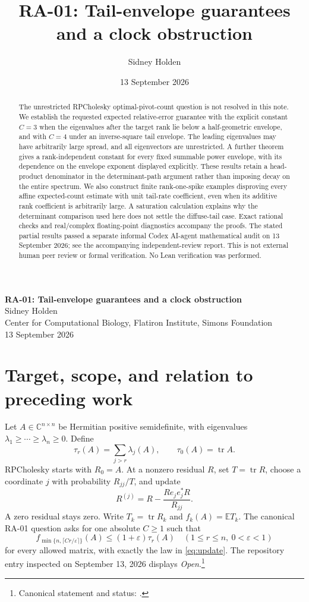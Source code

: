 \documentclass[11pt]{article}
\title{RA-01: Tail-envelope guarantees and a clock obstruction}
\author{Sidney Holden}\date{13 September 2026}
\theoremstyle{remark}\newtheorem{remark}[theorem]{Remark}
\DeclareMathOperator{\tr}{tr}
\newcommand{\E}{\mathbb E}
\newcommand{\C}{\mathbb C}
\newcommand{\eps}{\varepsilon}
\begin{document}
\begin{center}
{\Large\bfseries RA-01: Tail-envelope guarantees and a clock obstruction}
\\[0.8em]
Sidney Holden\\[0.3em]
{\small Center for Computational Biology, Flatiron Institute, Simons Foundation}\\[0.3em]
{\small 13 September 2026}
\end{center}
\vspace{0.4em}
\begin{abstract}
The unrestricted RPCholesky optimal-pivot-count question is not resolved in this note. We establish the requested expected relative-error guarantee with the explicit constant $C=3$ when the eigenvalues after the target rank lie below a half-geometric envelope, and with $C=4$ under an inverse-square tail envelope. The leading eigenvalues may have arbitrarily large spread, and all eigenvectors are unrestricted. A further theorem gives a rank-independent constant for every fixed summable power envelope, with its dependence on the envelope exponent displayed explicitly. These results retain a head-product denominator in the determinant-path argument rather than imposing decay on the entire spectrum. We also construct finite rank-one-spike examples disproving every affine expected-count estimate with unit tail-rate coefficient, even when its additive rank coefficient is arbitrarily large. A saturation calculation explains why the determinant comparison used here does not settle the diffuse-tail case. Exact rational checks and real/complex floating-point diagnostics accompany the proofs. The stated partial results passed a separate informal Codex AI-agent mathematical audit on 13 September 2026; see the accompanying independent-review report. This is not external human peer review or formal verification. No Lean verification was performed.
\end{abstract}

\section{Target, scope, and relation to preceding work}
Let $A\in\C^{n\times n}$ be Hermitian positive semidefinite, with eigenvalues
$\lambda_1\ge\cdots\ge\lambda_n\ge0$. Define
\[
 \tau_r(A)=\sum_{j>r}\lambda_j(A),\qquad \tau_0(A)=\tr A.
\]
RPCholesky starts with $R_0=A$. At a nonzero residual $R$, set $T=\tr R$, choose a coordinate $j$ with probability $R_{jj}/T$, and update
\begin{equation}
 R^{(j)}=R-\frac{Re_je_j^*R}{R_{jj}}. \label{eq:update}
\end{equation}
A zero residual stays zero. Write $T_k=\tr R_k$ and $f_k(A)=\E T_k$.
The canonical RA-01 question asks for one absolute $C\ge1$ such that
\begin{equation}
 f_{\min\{n,\lceil Cr/\eps\rceil\}}(A)
 \le (1+\eps)\tau_r(A)
 \quad(1\le r\le n,\ 0<\eps<1) \label{eq:target}
\end{equation}
for every allowed matrix, with exactly the law in \eqref{eq:update}. The repository entry inspected on September 13, 2026 displays \emph{Open}.\footnote{Canonical statement and status: \cite{repo}.}
\end{document}
